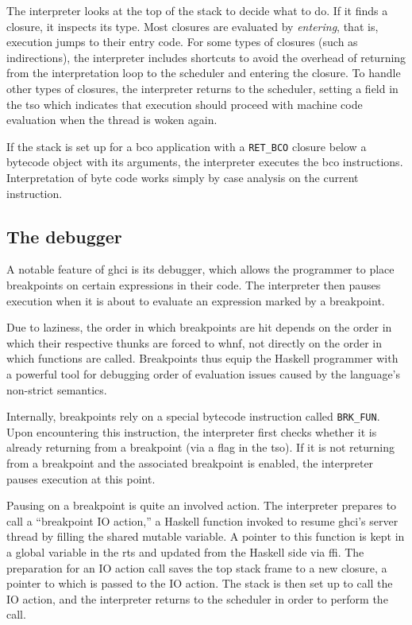 \documentclass[thesis=B,english]{FITthesis}[2019/12/23]
\begin{document}
The interpreter looks at the top of the stack to decide what to do. If it finds
a closure, it inspects its type. Most closures are evaluated by
\textit{entering}, that is, execution jumps to their entry code. For some types
of closures (such as indirections), the interpreter includes shortcuts to avoid
the overhead of returning from the interpretation loop to the scheduler and
entering the closure. To handle other types of closures, the interpreter
returns to the scheduler, setting a field in the \acrshort{tso} which indicates
that execution should proceed with machine code evaluation when the thread is
woken again.

If the stack is set up for a \acrshort{bco} application with a
\texttt{RET\_BCO} closure below a bytecode object with its arguments, the
interpreter executes the \acrshort{bco} instructions. Interpretation of byte
code works simply by case analysis on the current instruction.

\subsection*{The debugger}
A notable feature of \acrshort{ghci} is its debugger, which allows the
programmer to place breakpoints on certain expressions in their code. The
interpreter then pauses execution when it is about to evaluate an expression
marked by a breakpoint.

Due to laziness, the order in which breakpoints are hit depends on the order in
which their respective thunks are forced to \acrshort{whnf}, not directly on
the order in which functions are called. Breakpoints thus equip the Haskell
programmer with a powerful tool for debugging order of evaluation issues caused
by the language's non-strict semantics.

Internally, breakpoints rely on a special bytecode instruction called
\texttt{BRK\_FUN}. Upon encountering this instruction, the interpreter first
checks whether it is already returning from a breakpoint (via a flag in the
\acrshort{tso}). If it is not returning from a breakpoint and the associated
breakpoint is enabled, the interpreter pauses execution at this point.

Pausing on a breakpoint is quite an involved action. The interpreter prepares
to call a ``breakpoint IO action,'' a Haskell function invoked to resume
\acrshort{ghci}'s server thread by filling the shared mutable variable. A
pointer to this function is kept in a global variable in the \acrshort{rts} and
updated from the Haskell side via \acrshort{ffi}. The preparation for an IO
action call saves the top stack frame to a new closure, a pointer to which is
passed to the IO action. The stack is then set up to call the IO action, and
the interpreter returns to the scheduler in order to perform the call.
\end{document}
